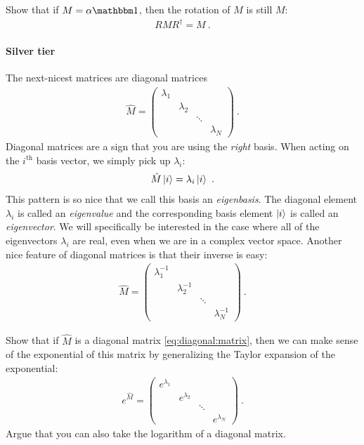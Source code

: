 \documentclass[12pt]{article}
\begin{document}
\begin{exercise}
Show that if $M = \alpha \one$, then the rotation of $M$ is still $M$:
\begin{align}
    RMR^\dag = M \ .
\end{align}
\end{exercise}

\paragraph{Silver tier} The next-nicest matrices are diagonal matrices
\begin{align}
\hat M = 
    \begin{pmatrix}
        \lambda_1 & & & \\
         & \lambda_2 & & \\
         & & \ddots & \\
         & & & \lambda_N
    \end{pmatrix} \ .
    \label{eq:diagonal:matrix}
\end{align}
Diagonal matrices are a sign that you are using the \emph{right} basis. When acting on the $i^\text{th}$ basis vector, we simply pick up $\lambda_i$:
\begin{align}
    \hat M \left|i\right\rangle = \lambda_i \left|i\right\rangle \ .
\end{align}
This pattern is so nice that we call this basis an \emph{eigenbasis}. The diagonal element $\lambda_i$ is called an \emph{eigenvalue} and the corresponding basis element $\left|i\right\rangle$ is called an \emph{eigenvector}. We will specifically be interested in the case where all of the eigenvectors $\lambda_i$ are real, even when we are in a complex vector space. Another nice feature of diagonal matrices is that their inverse is easy:
\begin{align}
    \hat M = 
        \begin{pmatrix}
        \lambda_1^{-1} & & & \\
         & \lambda_2^{-1} & & \\
         & & \ddots & \\
         & & & \lambda_N^{-1}
    \end{pmatrix} \ .
\end{align}


\begin{exercise}
Show that if $\hat M$ is a diagonal matrix \eqref{eq:diagonal:matrix}, then we can make sense of the exponential of this matrix by generalizing the Taylor expansion of the exponential:
\begin{align}
e^{\hat M} = 
    \begin{pmatrix}
        e^{\lambda_1} & & & \\
         & e^{\lambda_2} & & \\
         & & \ddots & \\
         & & & e^{\lambda_N}
    \end{pmatrix} \ .
    \label{eq:diagonal:matrix:exponential}
\end{align}
Argue that you can also take the logarithm of a diagonal matrix. 
\end{exercise}
\end{document}
